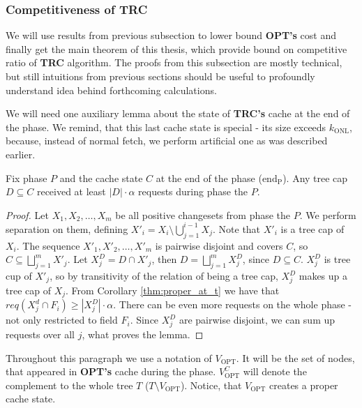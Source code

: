 \subsubsection{Competitiveness of TRC}
We will use results from previous subsection to lower bound \textbf{OPT's} cost 
and finally get the main theorem of this thesis, which provide bound on 
competitive ratio of \textbf{TRC} algorithm. The proofs from this subsection are
 mostly technical, but still intuitions from previous sections should be useful 
to profoundly understand idea behind forthcoming calculations.

We will need one auxiliary lemma about the state of \textbf{TRC's} cache at the 
end of the phase. We remind, that this last cache state is special - its size 
exceeds $k_{\mathrm{ONL}}$, because, instead of normal fetch, we perform 
artificial one as was described earlier.  
\begin{lemma}
Fix phase $P$ and the cache state  $C$ at the end of the phase 
($\mathrm{end_P}$). Any tree cap $D \subseteq C$ received at least 
$|D| \cdot \alpha$ requests during phase the $P$.
\label{thm:lots_of_req_in_tc_end_of_p}
\end{lemma}
\begin{proof}
Let $X_1, X_2, \ldots, X_m$ be all positive changesets from phase the $P$. 
We perform separation on them, defining 
$X'_i = X_i \setminus \bigcup_{j=1}^{i-1} X_j$. Note 
that $X'_i$ is a tree cap of $X_i$. The sequence $X'_1, X'_2, \ldots, X'_m$ is 
pairwise disjoint and covers $C$, so $C \subseteq \bigsqcup_{j=1}^m 
X'_j$. Let $X_j^D = D \cap X'_j$, then $D = \bigsqcup_{j=1}^m X_j^D$, since $D 
\subseteq C$. $X_j^D$ is tree cup of $X'_j$, so by transitivity of the relation 
of being a tree cap, $X_j^D$ makes up a tree cap of $X_j$. From Corollary 
\ref{thm:proper_at_t} we have that $req(X_j^d \cap F_i) \geq |X_j^D| \cdot 
\alpha$. There can be even more requests on the whole phase - not only 
restricted to 
field $F_i$. Since $X_j^D$ are pairwise disjoint, we can sum up requests over 
all $j$, what proves the lemma.
\end{proof}


Throughout this paragraph we use a notation of $V_{\mathrm{OPT}}$. It will be 
the set of nodes, that appeared in \textbf{OPT's} cache during the phase. 
$V_{\mathrm{OPT}}^C$ will 
denote the complement to the whole tree $T$ ($T \setminus V_{\mathrm{OPT}}$). 
Notice, 
that $V_{\mathrm{OPT}}$ creates a proper cache state.

